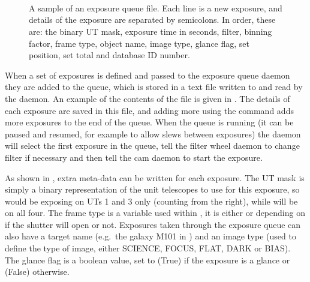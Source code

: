 \begin{colsection}
\begin{colsection}
\begin{figure}[t]
    \begin{center}
        \vspace{1cm}
        \\
        \\
        \\
        \vspace{0cm}
    \end{center}
    \caption[A sample exposure queue file]{
        A sample of an exposure queue file. Each line is a new exposure, and details of the exposure are separated by semicolons. In order, these are: the binary UT mask, exposure time in seconds, filter, binning factor, frame type, object name, image type, glance flag, set position, set total and database ID number.
    }\label{fig:exq_file}
\end{figure}

When a set of exposures is defined and passed to the exposure queue daemon they are added to the queue, which is stored in a text file written to and read by the daemon. An example of the contents of the file is given in . The details of each exposure are saved in this file, and adding more using the  command adds more exposures to the end of the queue. When the queue is running (it can be paused and resumed, for example to allow slews between exposures) the daemon will select the first exposure in the queue, tell the filter wheel daemon to change filter if necessary and then tell the cam daemon to start the exposure.

As shown in , extra meta-data can be written for each exposure. The UT mask is simply a binary representation of the unit telescopes to use for this exposure, so  would be exposing on UTs 1 and 3 only (counting from the right), while  will be on all four. The frame type is a variable used within , it is either  or  depending on if the shutter will open or not. Exposures taken through the exposure queue can also have a target name (e.g.\ the galaxy M101 in ) and an image type (used to define the type of image, either SCIENCE, FOCUS, FLAT, DARK or BIAS). The glance flag is a boolean value, set to  (True) if the exposure is a glance or  (False) otherwise.


\end{colsection}
\end{colsection}
